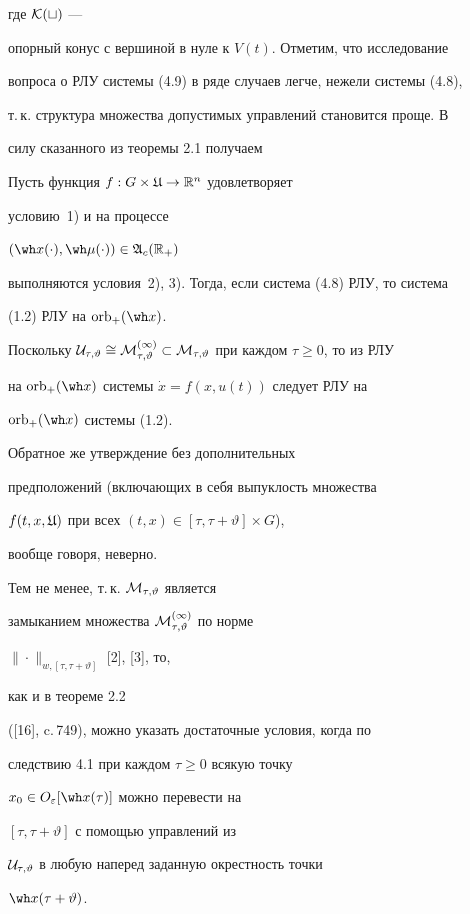 где $\cal K(t)$ ---


опорный конус с вершиной в нуле к $V(t)$. Отметим, что исследование


вопроса о РЛУ системы (4.9) в ряде случаев легче, нежели системы (4.8),


т.\,к. структура множества допустимых управлений становится проще. В


силу сказанного из теоремы 2.1 получаем





\begin{cors}


Пусть функция $f:G\times \frak U\to\Bbb R^n$ удовлетворяет


условию~1) и на процессе


$(\wh x(\cdot),\wh\mu(\cdot))\in\frak A_c(\bR_+)$


выполняются условия~2), 3). Тогда, если система (4.8) РЛУ, то система 


(1.2) РЛУ на $\orb_+(\wh x)$.


\end{cors}





\begin{notes}


Поскольку $\cal U_{\tau,\vartheta}\cong\cal M_{\tau,\vartheta}^{(1)}


\subset\cal M_{\tau,\vartheta}$ при каждом $\tau\ge0$, то из РЛУ


на $\orb_+(\wh x)$ системы $\Dot x=f(x,u(t))$ следует РЛУ на


$\orb_+(\wh x)$ системы (1.2).


Обратное же утверждение без дополнительных


предположений (включающих в себя выпуклость множества


$f(t,x,\frak U)$ при всех $(t,x)\in[\tau,\tau+\vartheta ]\times G$),


вообще говоря, неверно.


Тем не менее, т.\,к. $\cal M_{\tau,\vartheta}$ является


замыканием множества $\cal M_{\tau,\vartheta}^{(1)}$ по норме


$\|\cdot\|_{w,[\tau,\tau+\vartheta]}$ [2], [3], то,


как и в теореме 2.2


([16], c.\,749), можно указать достаточные условия, когда по


следствию 4.1 при каждом $\tau\ge0$ всякую точку


$x_0\in O_\varepsilon[\wh x(\tau)]$ можно перевести на


$[\tau,\tau+\vartheta]$ с помощью управлений из


$\cal U_{\tau,\vartheta}$ в любую наперед заданную окрестность точки


$\wh x(\tau+\vartheta)$.


\end{notes}


